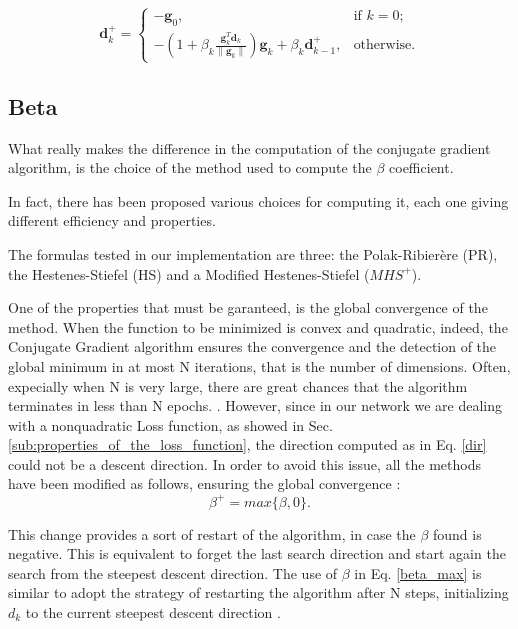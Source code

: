 			\begin{equation}
			\label{mod_dir}
				\textbf{d}_k^+=\begin{cases}
			    -\textbf{g}_0, & \text{if $k=0$};\\
			    -(1 + \beta_k\frac{\textbf{g}_k^T\textbf{d}_{k}}{\|\textbf{g}_k\|})\textbf{g}_k + \beta_k\textbf{d}_{k-1}^+, & \text{otherwise.}
			  \end{cases}
			\end{equation}



		\subsection{Beta}
		\label{sub:beta}
			What really makes the difference in the computation of the conjugate gradient algorithm, is the choice of the method used to compute the $\beta$ coefficient.

			In fact, there has been proposed various choices for computing it, each one giving different efficiency and properties.

			The formulas tested in our implementation are three: the Polak-Ribierère (PR), the Hestenes-Stiefel (HS) and a Modified Hestenes-Stiefel ($MHS^+$).

			One of the properties that must be garanteed, is the global convergence of the method. When the function to be minimized is convex and quadratic, indeed, the Conjugate Gradient algorithm ensures the convergence and the detection of the global minimum in at most N iterations, that is the number of dimensions. Often, expecially when N is very large, there are great chances that the algorithm terminates in less than N epochs.
			\cite{DIXON-1975}. 
			However, since in our network we are dealing with a nonquadratic Loss function, as showed in Sec.\ref{sub:properties_of_the_loss_function}, the direction computed as in Eq. \ref{dir} could not be a descent direction. In order to avoid this issue, all the methods have been modified as follows, ensuring the global convergence \cite{doi:10.1137/0802003}:
			\begin{equation}
			\label{beta_max}
				 \beta^+ = max\{\beta, 0\}.
			\end{equation}

			This change provides a sort of restart of the algorithm, in case the $\beta$ found is negative. This is equivalent to forget the last search direction and start again the search from the steepest descent direction. The use of $\beta$ in Eq. \ref{beta_max} is similar to adopt the strategy of restarting the algorithm after N steps, initializing $d_k$ to the current steepest descent direction
			\cite{MOLLER1993525,Gilbert-1992}.

